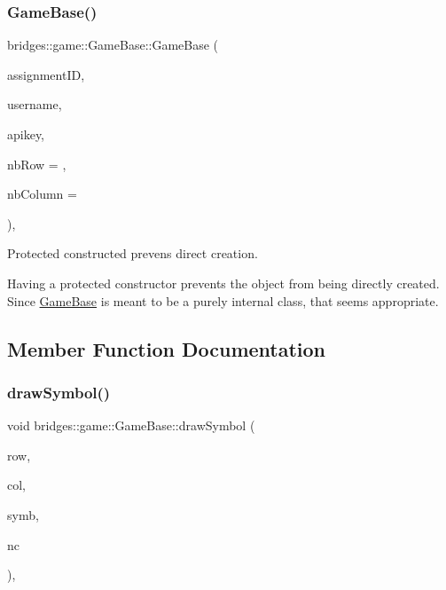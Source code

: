 \subsubsection{\texorpdfstring{Game\+Base()}{GameBase()}}
{\footnotesize\ttfamily bridges\+::game\+::\+Game\+Base\+::\+Game\+Base (\begin{DoxyParamCaption}\item[{int}]{assignment\+ID,  }\item[{std\+::string}]{username,  }\item[{std\+::string}]{apikey,  }\item[{int}]{nb\+Row = {},  }\item[{int}]{nb\+Column = {} }\end{DoxyParamCaption})\hspace{0.3cm}{\ttfamily [inline]}, {\ttfamily [protected]}}



Protected constructed prevens direct creation. 

Having a protected constructor prevents the object from being directly created. Since \hyperlink{classbridges_1_1game_1_1_game_base}{Game\+Base} is meant to be a purely internal class, that seems appropriate. 

\subsection{Member Function Documentation}
\mbox{\label{classbridges_1_1game_1_1_game_base_a415fa8f70bef364dfa966f2a86048901}} 
\subsubsection{\texorpdfstring{draw\+Symbol()}{drawSymbol()}}
{\footnotesize\ttfamily void bridges\+::game\+::\+Game\+Base\+::draw\+Symbol (\begin{DoxyParamCaption}\item[{int}]{row,  }\item[{int}]{col,  }\item[{\hyperlink{namespacebridges_1_1game_ab9a19c7ab6e2ebac2f95180e21733487}{Named\+Symbol}}]{symb,  }\item[{\hyperlink{namespacebridges_1_1game_afaa832a4322b25b6a4ebfba832f10f26}{Named\+Color}}]{nc }\end{DoxyParamCaption})\hspace{0.3cm}{\ttfamily [inline]}, {\ttfamily [protected]}}



